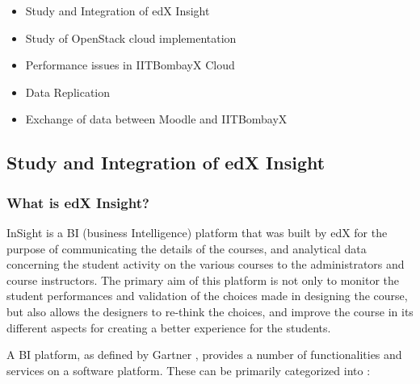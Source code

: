 \documentclass[14pt]{article}
\begin{document}
\begin{itemize}

\item 	Study and Integration of edX Insight
\item	Study of OpenStack cloud implementation
\item	Performance issues in IITBombayX Cloud
\item	Data Replication
\item	Exchange of data between Moodle and IITBombayX

\end{itemize}

\subsection{Study and Integration of edX Insight}

\subsubsection{What is edX Insight?}

InSight is a BI (business Intelligence) platform that was built by edX for the purpose of communicating the details of the courses, and analytical data concerning the student activity on the various courses to the administrators and course instructors. The primary aim of this platform is not only to monitor the student performances and validation of the choices made in designing the course, but also allows the designers to re-think the choices, and improve the course in its different aspects for creating a better experience for the students.

A BI platform, as defined by Gartner \cite{WhatIsBIPlatform}, provides a number of functionalities and services on a software platform. These can be primarily categorized into :
\end{document}
